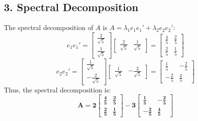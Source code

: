\documentclass[11pt]{article}
\begin{document}
\subsection*{3. Spectral Decomposition}
The spectral decomposition of $A$ is $A = \lambda_1 e_1 e_1' + \lambda_2 e_2 e_2'$:
\[
e_1 e_1' = \begin{bmatrix} \frac{2}{\sqrt{5}} \\ \frac{1}{\sqrt{5}} \end{bmatrix} \begin{bmatrix} \frac{2}{\sqrt{5}} & \frac{1}{\sqrt{5}} \end{bmatrix} = \begin{bmatrix} \frac{4}{5} & \frac{2}{5} \\[4pt] \frac{2}{5} & \frac{1}{5} \end{bmatrix}
\]
\[
e_2 e_2' = \begin{bmatrix} \frac{1}{\sqrt{5}} \\ -\frac{2}{\sqrt{5}} \end{bmatrix} \begin{bmatrix} \frac{1}{\sqrt{5}} & -\frac{2}{\sqrt{5}} \end{bmatrix} = \begin{bmatrix} \frac{1}{5} & -\frac{2}{5} \\[4pt] -\frac{2}{5} & \frac{4}{5} \end{bmatrix}
\]
Thus, the spectral decomposition is:
\[
\mathbf{A = 2 \begin{bmatrix} \frac{4}{5} & \frac{2}{5} \\[4pt] \frac{2}{5} & \frac{1}{5} \end{bmatrix} - 3 \begin{bmatrix} \frac{1}{5} & -\frac{2}{5} \\[4pt] -\frac{2}{5} & \frac{4}{5} \end{bmatrix}}
\]

\end{document}
